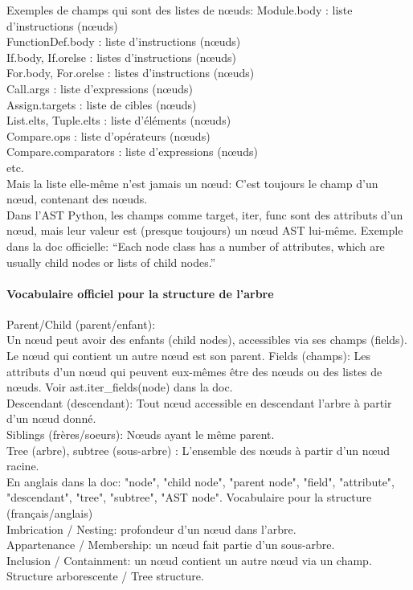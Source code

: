 \documentclass[11pt,a4paper]{article}
\begin{document}
Exemples de champs qui sont des listes de nœuds:
Module.body : liste d'instructions (nœuds)\\
FunctionDef.body : liste d'instructions (nœuds)\\
If.body, If.orelse : listes d'instructions (nœuds)\\
For.body, For.orelse : listes d'instructions (nœuds)\\
Call.args : liste d'expressions (nœuds)\\
Assign.targets : liste de cibles (nœuds)\\
List.elts, Tuple.elts : liste d'éléments (nœuds)\\
Compare.ops : liste d'opérateurs (nœuds)\\
Compare.comparators : liste d'expressions (nœuds)\\
etc.\\
Mais la liste elle-même n'est jamais un nœud:
C'est toujours le champ d'un nœud, contenant des nœuds.\\
Dans l'AST Python, les champs comme target, iter, func sont des attributs d'un nœud, mais leur valeur est (presque toujours) un nœud AST lui-même.
Exemple dans la doc officielle: ``Each node class has a number of attributes, which are usually child nodes or lists of child nodes.''
\newline

\paragraph{Vocabulaire officiel pour la structure de l'arbre}
Parent/Child (parent/enfant):\\
Un nœud peut avoir des enfants (child nodes), accessibles via ses champs (fields).
Le nœud qui contient un autre nœud est son parent.
Fields (champs):
Les attributs d'un nœud qui peuvent eux-mêmes être des nœuds ou des listes de nœuds.
Voir ast.iter\_fields(node) dans la doc.\\
Descendant (descendant):
Tout nœud accessible en descendant l'arbre à partir d'un nœud donné.\\
Siblings (frères/soeurs):
Nœuds ayant le même parent.\\
Tree (arbre), subtree (sous-arbre) :
L'ensemble des nœuds à partir d'un nœud racine.\\
En anglais dans la doc:
"node", "child node", "parent node", "field", "attribute", "descendant", "tree", "subtree", "AST node".
Vocabulaire pour la structure (français/anglais)\\
Imbrication / Nesting: profondeur d'un nœud dans l'arbre.\\
Appartenance / Membership: un nœud fait partie d'un sous-arbre.\\
Inclusion / Containment: un nœud contient un autre nœud via un champ.\\
Structure arborescente / Tree structure.
\\
\end{document}
